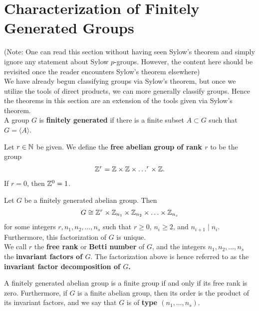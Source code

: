 \documentclass{memoir}
\begin{document}


\section{Characterization of Finitely Generated Groups}
\label{sec:characterization_of_finitely_generated_groups}
(Note: One can read this section without having seen Sylow's theorem and simply ignore any statement about Sylow \(p\)-groups. However, the content here should be revisited once the reader encounters Sylow's theorem elsewhere)\\

We have already begun classifying groups via Sylow's theorem, but once we utilize the tools of direct products, we can more generally classify groups. Hence the theorems in this section are an extension of the tools given via Sylow's theorem.\\

A group \(G\) is \textbf{finitely generated} if there is a finite subset \(A\subset G\) such that \(G = \langle A \rangle \).

\begin{defn}
	Let \(r \in \mathbb{N}\) be given. We define the \textbf{free abelian group of rank \(r\)} to be the group
	\begin{align*}
		\mathbb{Z}^{r} = \mathbb{Z}\times \mathbb{Z}\times \ldots^{r}\times \mathbb{Z}.
	\end{align*}
	If \(r = 0\), then \(\mathbb{Z}^{0}=1\).
\end{defn}

\begin{thm}
	Let \(G\) be a finitely generated abelian group. Then
	\begin{align*}
		G \cong \mathbb{Z}^{r} \times \mathbb{Z}_{n_1} \times \mathbb{Z}_{n_2}\times \ldots\times \mathbb{Z}_{n_s}
	\end{align*}
	for some integers \(r,n_1,n_2,\ldots,n_s\) such that \(r\geq 0\), \(n_i \geq 2\), and \(n_{i+1}\mid n_i\). Furthermore, this factorization of \(G\) is unique.\\

	We call \(r\) the \textbf{free rank} or \textbf{Betti number} of \(G\), and the integers \(n_1,n_2,\ldots,n_s\) the \textbf{invariant factors of \(G\)}. The factorization above is hence referred to as the \textbf{invariant factor decomposition of \(G\).}
\end{thm}
A finitely generated abelian group is a finite group if and only if its free rank is zero. Furthermore, if  \(G\) is a finite abelian group, then its order is the product of its invariant factors, and we say that \(G\) is of \textbf{type  \((n_1,\ldots,n_s)\)}.\\
\end{document}
